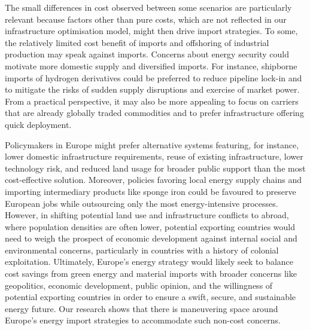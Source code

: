 The small differences in cost observed between some scenarios are particularly
relevant because factors other than pure costs, which are not reflected in our
infrastructure optimisation model, might then drive import strategies. To some,
the relatively limited cost benefit of imports and offshoring of industrial
production may speak against imports. Concerns about energy security could
motivate more domestic supply and diversified imports. For instance, shipborne
imports of hydrogen derivatives could be preferred to reduce pipeline lock-in
and to mitigate the risks of sudden supply disruptions and exercise of market
power. From a practical perspective, it may also be more appealing to focus on
carriers that are already globally traded commodities and to prefer
infrastructure offering quick deployment.

Policymakers in Europe might prefer alternative systems featuring, for instance,
lower domestic infrastructure requirements, reuse of existing infrastructure,
lower technology risk, and reduced land usage for broader public support than
the most cost-effective solution. Moreover, policies favoring local energy
supply chains and importing intermediary products like sponge iron could be
favoured to preserve European jobs while outsourcing only the most
energy-intensive processes. However, in shifting potential land use and
infrastructure conflicts to abroad, where population densities are often lower,
potential exporting countries would need to weigh the prospect of economic
development against internal social and environmental concerns, particularly in
countries with a history of colonial
exploitation.\cite{tunnGreenHydrogenTransitions2024} Ultimately, Europe's energy
strategy would likely seek to balance cost savings from green energy and
material imports with broader concerns like geopolitics, economic development,
public opinion, and the willingness of potential exporting countries in order to
ensure a swift, secure, and sustainable energy future. Our research shows that
there is maneuvering space around Europe's energy import strategies to
accommodate such non-cost concerns.
